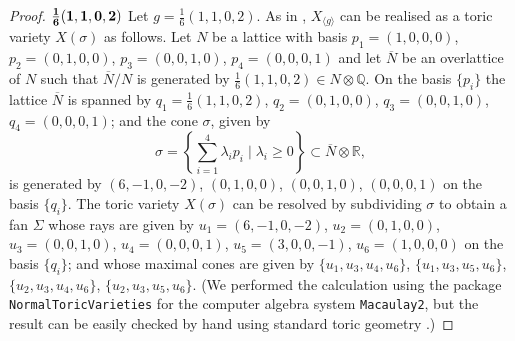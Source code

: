 \documentclass[12pt, a4paper]{article}
\newcommand{\RR}{\mathbb{R}}
\newcommand{\QQ}{\mathbb{Q}}
\newcommand{\la}{\langle}
\newcommand{\ra}{\rangle}
\begin{document}
\begin{proof}
  \noindent $\bold{\frac{1}{6}(1,1,0,2)}$
  Let $g = \frac{1}{6}(1,1,0,2)$. 
  As in \cite{Tai},  $X_{\la g \ra}$ can be realised as a toric variety $X(\sigma)$ as follows.
  Let $N$ be a lattice with basis
  $p_1=(1,0,0,0)$,
  $p_2=(0,1,0,0)$,
  $p_3=(0,0,1,0)$,
  $p_4=(0,0,0,1)$
  and let $\overline{N}$ be an overlattice of $N$ such that $\overline{N}/N$ is generated by $\frac{1}{6}(1,1,0,2) \in N \otimes \QQ$.
  On the basis $\{ p_i \}$ the lattice $\overline{N}$ is spanned by
  $q_1=\frac{1}{6}(1,1,0,2)$,
  $q_2=(0,1,0,0)$,
  $q_3=(0,0,1,0)$,
  $q_4=(0,0,0,1)$;
  and the cone $\sigma$, given by
  \[
    \sigma =
    \left \{
    \sum_{i=1}^4 \lambda_i p_i \mid \lambda_i \geq 0
    \right \}
    \subset \overline{N} \otimes \RR,
  \]
  is generated by
  $(6,-1,0,-2)$,
  $(0,1,0,0)$,
  $(0,0,1,0)$,
  $(0,0,0,1)$
  on the basis $\{q_i\}$.
  The toric variety $X(\sigma)$ can be resolved by subdividing $\sigma$ to obtain a fan $\Sigma$ whose rays are given by
  $u_1=(6,-1,0,-2)$,
  $u_2=(0,1,0,0)$,
  $u_3=(0,0,1,0)$,
  $u_4=(0,0,0,1)$,
  $u_5=(3,0,0,-1)$,
  $u_6=(1,0,0,0)$
  on the basis $\{q_i\}$;
  and whose maximal cones are given by
  $\{u_1, u_3, u_4, u_6 \}$,
  $\{u_1, u_3, u_5, u_6 \}$,
  $\{u_2, u_3, u_4, u_6 \}$,
  $\{u_2, u_3, u_5, u_6 \}$.
  (We performed the calculation using the package \texttt{NormalToricVarieties} for the computer algebra system  \texttt{Macaulay2}, but the result can be easily checked by hand using standard toric geometry \cite{Fulton}.)
  

\end{proof}
\end{document}
